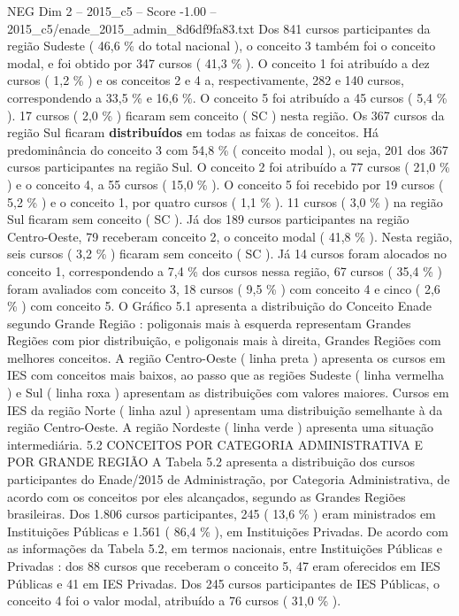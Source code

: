 \begin{textsample}{NEG Dim 2 – 2015\_c5 – Score -1.00 – 2015\_c5/enade\_2015\_admin\_8d6df9fa83.txt}
Dos 841 cursos participantes da região Sudeste ( 46,6 \% do total nacional ), o conceito 3 também foi o conceito modal, e foi obtido por 347 cursos ( 41,3 \% ).
O conceito 1 foi atribuído a dez cursos ( 1,2 \% ) e os conceitos 2 e 4 a, respectivamente, 282 e 140 cursos, correspondendo a 33,5 \% e 16,6 \%.
O conceito 5 foi atribuído a 45 cursos ( 5,4 \% ). 17 cursos ( 2,0 \% ) ficaram sem conceito ( SC ) nesta região.
Os 367 cursos da região Sul ficaram \textbf{distribuídos} em todas as faixas de conceitos.
Há predominância do conceito 3 com 54,8 \% ( conceito modal ), ou seja, 201 dos 367 cursos participantes na região Sul.
O conceito 2 foi atribuído a 77 cursos ( 21,0 \% ) e o conceito 4, a 55 cursos ( 15,0 \% ).
O conceito 5 foi recebido por 19 cursos ( 5,2 \% ) e o conceito 1, por quatro cursos ( 1,1 \% ). 11 cursos ( 3,0 \% ) na região Sul ficaram sem conceito ( SC ).
Já dos 189 cursos participantes na região Centro-Oeste, 79 receberam conceito 2, o conceito modal ( 41,8 \% ).
Nesta região, seis cursos ( 3,2 \% ) ficaram sem conceito ( SC ).
Já 14 cursos foram alocados no conceito 1, correspondendo a 7,4 \% dos cursos nessa região, 67 cursos ( 35,4 \% ) foram avaliados com conceito 3, 18 cursos ( 9,5 \% ) com conceito 4 e cinco ( 2,6 \% ) com conceito 5.
O Gráfico 5.1 apresenta a distribuição do Conceito Enade segundo Grande Região : poligonais mais à esquerda representam Grandes Regiões com pior distribuição, e poligonais mais à direita, Grandes Regiões com melhores conceitos.
A região Centro-Oeste ( linha preta ) apresenta os cursos em IES com conceitos mais baixos, ao passo que as regiões Sudeste ( linha vermelha ) e Sul ( linha roxa ) apresentam as distribuições com valores maiores.
Cursos em IES da região Norte ( linha azul ) apresentam uma distribuição semelhante à da região Centro-Oeste.
A região Nordeste ( linha verde ) apresenta uma situação intermediária. 5.2 CONCEITOS POR CATEGORIA ADMINISTRATIVA E POR GRANDE REGIÃO A Tabela 5.2 apresenta a distribuição dos cursos participantes do Enade/2015 de Administração, por Categoria Administrativa, de acordo com os conceitos por eles alcançados, segundo as Grandes Regiões brasileiras.
Dos 1.806 cursos participantes, 245 ( 13,6 \% ) eram ministrados em Instituições Públicas e 1.561 ( 86,4 \% ), em Instituições Privadas.
De acordo com as informações da Tabela 5.2, em termos nacionais, entre Instituições Públicas e Privadas : dos 88 cursos que receberam o conceito 5, 47 eram oferecidos em IES Públicas e 41 em IES Privadas.
Dos 245 cursos participantes de IES Públicas, o conceito 4 foi o valor modal, atribuído a 76 cursos ( 31,0 \% ).

\end{textsample}
